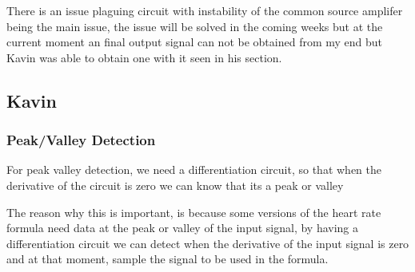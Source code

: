 \documentclass{article}
\begin{document}
\begin{center}
\end{center}
\begin{center}
\end{center}
There is an issue plaguing circuit with instability of the common source amplifer being the main issue, the issue will be solved in the coming weeks but at the current moment an final output signal can not be obtained from my end but Kavin was able to obtain one with it seen in his section.
\newpage
\subsection{Kavin}
\subsubsection{Peak/Valley Detection}
For peak valley detection, we need a differentiation circuit, so that when the derivative of the circuit is zero we can know that its a peak or valley

The reason why this is important, is because some versions of the heart rate formula need data at the peak or valley of the input signal, by having a differentiation circuit we can detect when the derivative of the input signal is zero and at that moment, sample the signal to be used in the formula.
\end{document}

